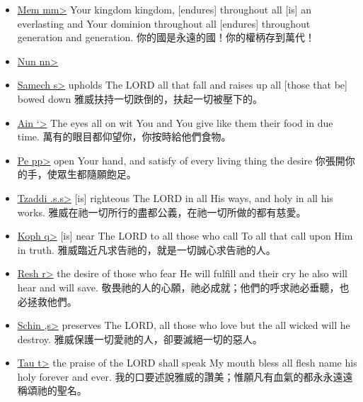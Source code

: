\begin{itemize}
\item \underline{Mem \<mm>} Your kingdom kingdom, [endures] throughout all [is] an everlasting and Your dominion throughout all [endures] throughout generation and generation. 你的國是永遠的國！你的權柄存到萬代！
\item \underline{Nun \<nn>} 
\item \underline{Samech \<s>} upholds The LORD all that fall and raises up all [those that be] bowed down 雅威扶持一切跌倒的，扶起一切被壓下的。
\item \underline{Ain \<`>} The eyes all on wit You and You give like them their food in due time. 萬有的眼目都仰望你，你按時給他們食物。
\item \underline{Pe \<pp>} open Your hand, and satisfy of every living thing the desire 你張開你的手，使眾生都隨願飽足。
\item \underline{Tzaddi \<.s.s>} [is] righteous The LORD in all His ways, and holy in all his works. 雅威在祂一切所行的盡都公義，在祂一切所做的都有慈愛。
\item \underline{Koph \<q>} [is] near The LORD to all those who call To all that call upon Him in truth. 雅威臨近凡求告祂的，就是一切誠心求告祂的人。
\item \underline{Resh  \<r>} the desire of those who fear He will fulfill and their cry he also will hear and will save. 敬畏祂的人的心願，祂必成就；他們的呼求祂必垂聽，也必拯救他們。
\item \underline{Schin \<,s>} preserves The LORD, all those who love but the all wicked will he destroy. 雅威保護一切愛祂的人，卻要滅絕一切的惡人。
\item \underline{Tau \<t>} the praise of the LORD shall speak My mouth bless all flesh name his holy forever and ever. 我的口要述說雅威的讚美；惟願凡有血氣的都永永遠遠稱頌祂的聖名。
\end{itemize}




















